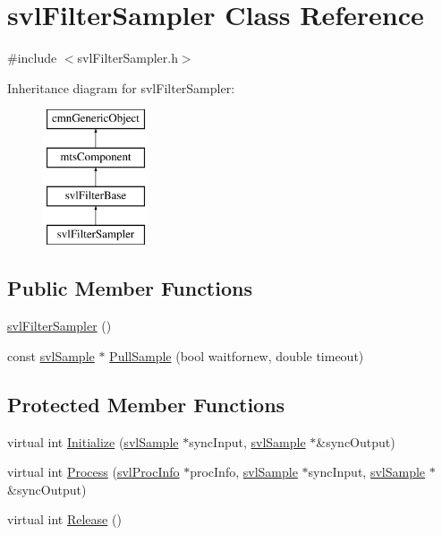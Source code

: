 \hypertarget{classsvl_filter_sampler}{}\section{svl\+Filter\+Sampler Class Reference}
\label{classsvl_filter_sampler}


{\ttfamily \#include $<$svl\+Filter\+Sampler.\+h$>$}

Inheritance diagram for svl\+Filter\+Sampler\+:\begin{figure}[H]
\begin{center}
\leavevmode
\includegraphics[height=4.000000cm]{d8/d7f/classsvl_filter_sampler}
\end{center}
\end{figure}
\subsection*{Public Member Functions}
\begin{DoxyCompactItemize}
\item 
\hyperlink{classsvl_filter_sampler_a52830e19a37a3f99618a48d4024e566e}{svl\+Filter\+Sampler} ()
\item 
const \hyperlink{classsvl_sample}{svl\+Sample} $\ast$ \hyperlink{classsvl_filter_sampler_ab97aeed45583e3793d4a88d34220d299}{Pull\+Sample} (bool waitfornew, double timeout)
\end{DoxyCompactItemize}
\subsection*{Protected Member Functions}
\begin{DoxyCompactItemize}
\item 
virtual int \hyperlink{classsvl_filter_sampler_a06c0ba3257ff6d77b4a581fff88145eb}{Initialize} (\hyperlink{classsvl_sample}{svl\+Sample} $\ast$sync\+Input, \hyperlink{classsvl_sample}{svl\+Sample} $\ast$\&sync\+Output)
\item 
virtual int \hyperlink{classsvl_filter_sampler_a99815e0afecdce2407de109adf1bacdb}{Process} (\hyperlink{structsvl_proc_info}{svl\+Proc\+Info} $\ast$proc\+Info, \hyperlink{classsvl_sample}{svl\+Sample} $\ast$sync\+Input, \hyperlink{classsvl_sample}{svl\+Sample} $\ast$\&sync\+Output)
\item 
virtual int \hyperlink{classsvl_filter_sampler_a65c26c24a9445bad7dc634c5ef7e4eb7}{Release} ()
\end{DoxyCompactItemize}
